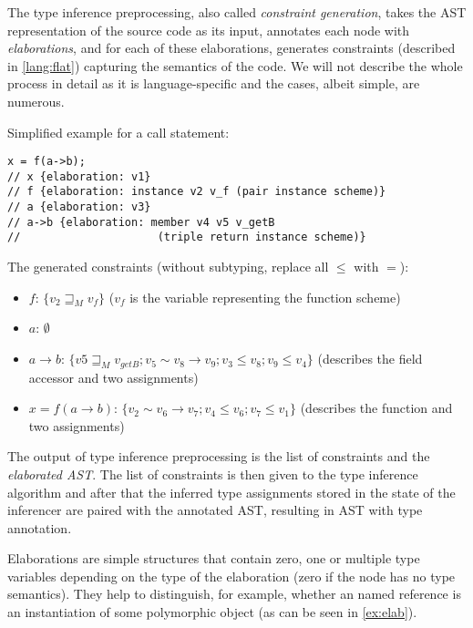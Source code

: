 The type inference preprocessing, also called \emph{constraint generation}, takes the AST representation of the source code as its input, annotates each node with \emph{elaborations}, and for each of these elaborations, generates constraints (described in \cref{lang:flat}) capturing the semantics of the code. We will not describe the whole process in detail as it is language-specific and the cases, albeit simple, are numerous.

\begin{ex}[Elaborations]
    \label{ex:elab}
    Simplified example for a call statement:

    \begin{lstlisting}
x = f(a->b);
// x {elaboration: v1}
// f {elaboration: instance v2 v_f (pair instance scheme)}
// a {elaboration: v3}
// a->b {elaboration: member v4 v5 v_getB
//                     (triple return instance scheme)}
    \end{lstlisting}

    The generated constraints (without subtyping, replace all $\leq$ with $=$):
    \begin{itemize}
        \item $f$: $\{v_2 \sqsupseteq_M v_f\}$ ($v_f$ is the variable representing the function scheme)
        \item $a$: $\emptyset$
        \item $a \to b$: $\{v5 \sqsupseteq_M v_{getB}; v_5 \sim v_8 \to v_9; v_3 \leq v_8; v_9 \leq v_4\}$ (describes the field accessor and two assignments)
        \item $x = f(a \to b)$: $\{v_2 \sim v_6 \to v_7; v_4 \leq v_6; v_7 \leq v_1\}$ (describes the function and two assignments)
    \end{itemize}
\end{ex}

The output of type inference preprocessing is the list of constraints and the \emph{elaborated AST}. The list of constraints is then given to the type inference algorithm and after that the inferred type assignments stored in the state of the inferencer are paired with the annotated AST, resulting in AST with type annotation.

\begin{remark}[Elaborations]
    Elaborations are simple structures that contain zero, one or multiple type variables depending on the type of the elaboration (zero if the node has no type semantics). They help to distinguish, for example, whether an named reference is an instantiation of some polymorphic object (as can be seen in \cref{ex:elab}).
\end{remark}

